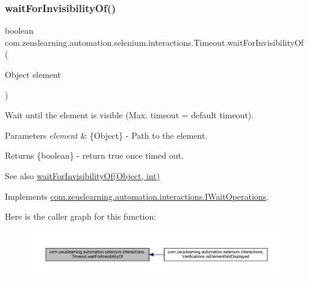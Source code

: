 \subsubsection{\texorpdfstring{wait\+For\+Invisibility\+Of()}{waitForInvisibilityOf()}\hspace{0.1cm}{\footnotesize\ttfamily [1/2]}}
{\footnotesize\ttfamily boolean com.\+zeuslearning.\+automation.\+selenium.\+interactions.\+Timeout.\+wait\+For\+Invisibility\+Of (\begin{DoxyParamCaption}\item[{Object}]{element }\end{DoxyParamCaption})\hspace{0.3cm}{\ttfamily [inline]}}

Wait until the element is visible (Max. timeout = default timeout).


\begin{DoxyParams}{Parameters}
{\em element} & \{Object\} -\/ Path to the element.\\
\hline
\end{DoxyParams}
\begin{DoxyReturn}{Returns}
\{boolean\} -\/ return {\ttfamily true} once timed out.
\end{DoxyReturn}
\begin{DoxySeeAlso}{See also}
\hyperlink{classcom_1_1zeuslearning_1_1automation_1_1selenium_1_1interactions_1_1Timeout_aa8e8bb7ba589f1c9f4fbf8fd245e3028}{wait\+For\+Invisibility\+Of(\+Object, int)} 
\end{DoxySeeAlso}


Implements \hyperlink{interfacecom_1_1zeuslearning_1_1automation_1_1interactions_1_1IWaitOperations_a92e178778c5219ee00b59f5d8cdc8f94}{com.\+zeuslearning.\+automation.\+interactions.\+I\+Wait\+Operations}.

Here is the caller graph for this function\+:
\nopagebreak
\begin{figure}[H]
\begin{center}
\leavevmode
\includegraphics[width=350pt]{d9/df4/classcom_1_1zeuslearning_1_1automation_1_1selenium_1_1interactions_1_1Timeout_adefb45ce06aba9bedc30a707f41ebe3f_icgraph}
\end{center}
\end{figure}
\hypertarget{classcom_1_1zeuslearning_1_1automation_1_1selenium_1_1interactions_1_1Timeout_aa8e8bb7ba589f1c9f4fbf8fd245e3028}{}\label{classcom_1_1zeuslearning_1_1automation_1_1selenium_1_1interactions_1_1Timeout_aa8e8bb7ba589f1c9f4fbf8fd245e3028} 
